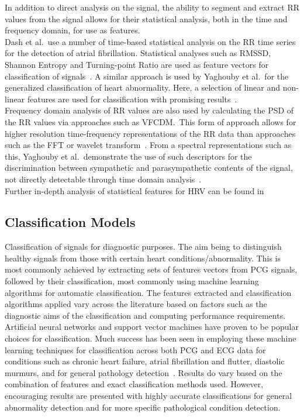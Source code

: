 \documentclass[titlepage, 12pt]{scrartcl} \usepackage{enumitem}
\begin{document}
In addition to direct analysis on the signal, the ability to segment
and extract RR values from the signal allows for their statistical
analysis, both in the time and frequency domain, for use as features.\\
Dash et al.\ use a number of time-based statistical analysis on the RR
time series for the detection of atrial fibrillation. Statistical
analyses such as RMSSD, Shannon Entropy and Turning-point Ratio are
used as feature vectors for classification of
signals~\citeyearpar{Dash2009}.  A similar approach is used by Yaghouby
et al.\ for the generalized classification of heart abnormality. Here,
a selection of linear and non-linear features are used for
classification with promising results~\citeyearpar{Yaghouby2009}.\\
Frequency domain analysis of RR values are also used by calculating the
PSD of the RR values via  approaches such as VFCDM.\ This form of
approach allows for higher resolution time-frequency representations of
the RR data than approaches such as the FFT or wavelet transform~\parencite{Wang2006}.
From a spectral representations such as this, Yaghouby et al.\
demonstrate the use of such descriptors for the discrimination between
sympathetic and parasympathetic contents of the signal, not directly
detectable through time domain analysis~\citeyearpar{Yaghouby2009}.\\
Further in-depth analysis of statistical features for HRV can be found
in~\parencite{Electrophysiology1996}

\subsection{Classification Models}

Classification of signals for diagnostic purposes.  The aim being to
distinguish healthy signals from those with certain heart
conditions/abnormality. This is most commonly achieved by extracting
sets of features vectors from PCG signals, followed by their
classification, most commonly using machine learning algorithms for
automatic classification. The features extracted and classification
algorithms applied vary across the literature based on factors such as
the diagnostic aims of the classification and computing performance
requirements.\\

Artificial neural networks and support vector machines have proven to
be popular choices for classification. Much success has been seen in
employing these machine learning techniques for classification across
both PCG and ECG data for conditions such as chronic heart failure,
atrial fibrillation and flutter, diastolic murmurs, and for general
pathology detection~\parencite{Cathers1995, Wu1995, Bung2000,
Lubaib2016, Maji2014, Ari2010, Maglogiannis2009}. Results do vary based
on the combination of features and exact classification methods used.
However, encouraging results are presented with highly accurate
classifications for general abnormality detection and for more specific
pathological condition detection.\\
\end{document}
